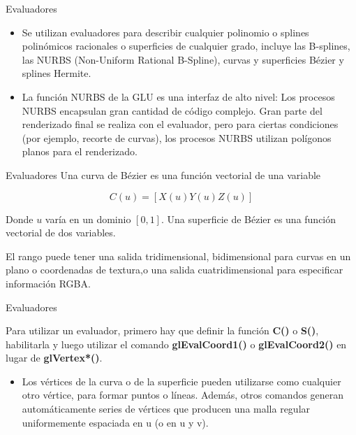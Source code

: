 \documentclass[10.5pt]{beamer}
\begin{document}
\begin{frame}{Evaluadores}
\begin{itemize}
\justifying
    \item Se utilizan evaluadores para describir cualquier polinomio o splines polinómicos racionales o superficies de cualquier grado, incluye las B-splines, las NURBS (Non-Uniform Rational B-Spline), curvas y superficies Bézier y splines Hermite.

     \item   La función NURBS de la GLU es una interfaz de alto nivel: Los procesos NURBS encapsulan gran cantidad de código complejo. Gran parte del renderizado final se realiza con el evaluador, pero para ciertas condiciones (por ejemplo, recorte de curvas), los procesos NURBS utilizan polígonos planos para el renderizado.
\end{itemize}
\end{frame}
\begin{frame}{Evaluadores}
\justifying
 Una curva de Bézier es una función vectorial de una variable
 \begin{block}
 \small
      \begin{equation*}
         C\left(u\right)=[X\left(u\right)Y\left(u\right)Z\left(u\right)]
      \end{equation*}
 \end{block}

Donde $u$ varía en un dominio $[0,1]$. Una superficie de Bézier es una función vectorial de dos variables.

El rango puede tener una salida tridimensional, bidimensional para curvas en un plano o coordenadas de textura,o una salida cuatridimensional para especificar información RGBA.
\end{frame}
\begin{frame}{Evaluadores}
\begin{block}
\justifying
    Para utilizar un evaluador, primero hay que definir la función \textbf{C()} o \textbf{S()}, habilitarla y luego utilizar el comando \textbf{glEvalCoord1()} o \textbf{glEvalCoord2()} en lugar de \textbf{glVertex*()}.
\end{block}

\begin{itemize}
\justifying

    \item Los vértices de la curva o de la superficie pueden utilizarse como cualquier otro vértice, para formar puntos o líneas. Además, otros comandos generan automáticamente series de vértices que producen una malla regular uniformemente espaciada en u (o en u y v).
\end{itemize}
\end{frame}
\end{document}
